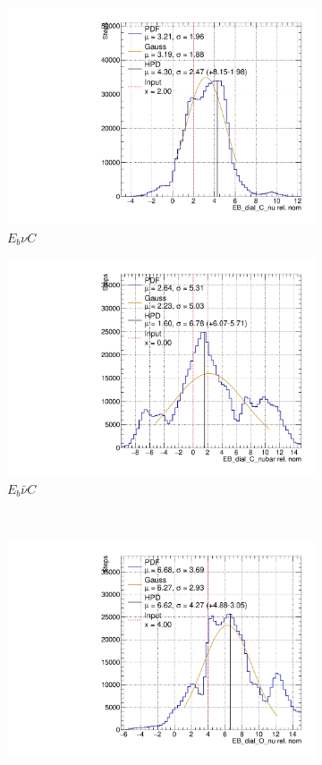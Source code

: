 \begin{figure}[t]
\centering
\begin{subfigure}{.48\textwidth}
  \centering
  \includegraphics[width=0.73\linewidth]{figs/EB_dial_C_nuFluc}
  \caption{$E_{b}\nu C$}
\end{subfigure}
\begin{subfigure}{.48\textwidth}
  \centering
  \includegraphics[width=0.73\linewidth]{figs/EB_dial_C_nubarFluc}
  \caption{$E_{b}\bar{\nu}C$}
\end{subfigure} \\
\begin{subfigure}{.48\textwidth}
  \centering
  \includegraphics[width=0.73\linewidth]{figs/EB_dial_O_nuFluc}

\end{subfigure}
\end{figure}
